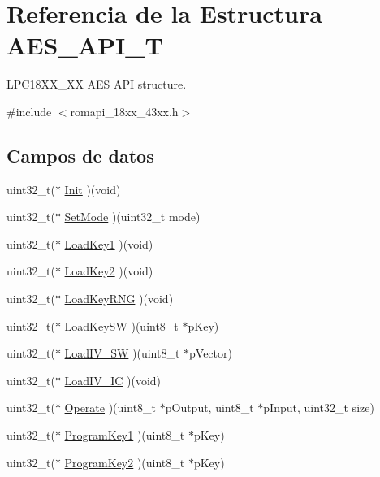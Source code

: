 \hypertarget{struct_a_e_s___a_p_i___t}{}\section{Referencia de la Estructura A\+E\+S\+\_\+\+A\+P\+I\+\_\+T}
\label{struct_a_e_s___a_p_i___t}


L\+P\+C18\+X\+X\+\_\+XX A\+ES A\+PI structure.  




{\ttfamily \#include $<$romapi\+\_\+18xx\+\_\+43xx.\+h$>$}

\subsection*{Campos de datos}
\begin{DoxyCompactItemize}
\item 
uint32\+\_\+t($\ast$ \hyperlink{struct_a_e_s___a_p_i___t_a8a4babfa1f2262f27ab56052d32844a9}{Init} )(void)
\item 
uint32\+\_\+t($\ast$ \hyperlink{struct_a_e_s___a_p_i___t_ab1fdde69b99912ece1b9950581cec0a6}{Set\+Mode} )(uint32\+\_\+t mode)
\item 
uint32\+\_\+t($\ast$ \hyperlink{struct_a_e_s___a_p_i___t_a762bb901b2853d0795c07211b730189e}{Load\+Key1} )(void)
\item 
uint32\+\_\+t($\ast$ \hyperlink{struct_a_e_s___a_p_i___t_a62a8f0af84db0dfe17b22906017e9339}{Load\+Key2} )(void)
\item 
uint32\+\_\+t($\ast$ \hyperlink{struct_a_e_s___a_p_i___t_aa5bcdf39145584cc13cda68909d2eb0e}{Load\+Key\+R\+NG} )(void)
\item 
uint32\+\_\+t($\ast$ \hyperlink{struct_a_e_s___a_p_i___t_a123b9aa75ddb666dc654ab2044badfcb}{Load\+Key\+SW} )(uint8\+\_\+t $\ast$p\+Key)
\item 
uint32\+\_\+t($\ast$ \hyperlink{struct_a_e_s___a_p_i___t_a272fe17e4249cd0de2eb81f37739f418}{Load\+I\+V\+\_\+\+SW} )(uint8\+\_\+t $\ast$p\+Vector)
\item 
uint32\+\_\+t($\ast$ \hyperlink{struct_a_e_s___a_p_i___t_a22c872b86b59b412081dac3ce552460e}{Load\+I\+V\+\_\+\+IC} )(void)
\item 
uint32\+\_\+t($\ast$ \hyperlink{struct_a_e_s___a_p_i___t_aee88458276a7d0fbba60349e243d9c75}{Operate} )(uint8\+\_\+t $\ast$p\+Output, uint8\+\_\+t $\ast$p\+Input, uint32\+\_\+t size)
\item 
uint32\+\_\+t($\ast$ \hyperlink{struct_a_e_s___a_p_i___t_a41478b6b72c35c5910d9dc92f438352e}{Program\+Key1} )(uint8\+\_\+t $\ast$p\+Key)
\item 
uint32\+\_\+t($\ast$ \hyperlink{struct_a_e_s___a_p_i___t_ad8bbd5c2f0dfd1b3be8ffad8ebcf8b37}{Program\+Key2} )(uint8\+\_\+t $\ast$p\+Key)
\end{DoxyCompactItemize}


